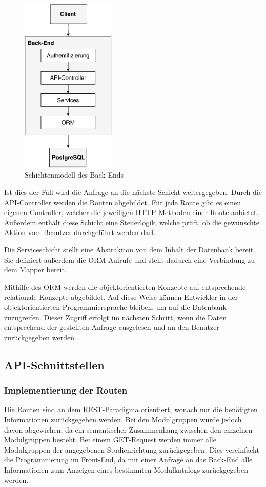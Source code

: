 \begin{figure}[h]
	\centering 
	\includegraphics[width=0.4\textwidth]{img/SchichtenmodellBackend.pdf}
	\captionsetup{format=hang}
	\caption[Schichtenmodell des Back-Ends]{\label{fig:Schichtenmodell}Schichtenmodell des Back-Ends}
\end{figure}

Ist dies der Fall wird die Anfrage an die nächste Schicht weitergegeben.
Durch die API-Controller werden die Routen abgebildet.
Für jede Route gibt es einen eigenen Controller, welcher die jeweiligen \acs{HTTP}-Methoden einer Route anbietet.
Außerdem enthält diese Schicht eine Steuerlogik, welche prüft, ob die gewünschte Aktion vom Benutzer durchgeführt werden darf. 

Die Serviceschicht stellt eine Abstraktion von dem Inhalt der Datenbank bereit.
Sie definiert außerdem die \ac{ORM}-Aufrufe und stellt dadurch eine Verbindung zu dem Mapper bereit. 

Mithilfe des \ac{ORM} werden die objektorientierten Konzepte auf entsprechende relationale Konzepte abgebildet.
Auf diese Weise können Entwickler in der objektorientierten Programmiersprache bleiben, um auf die Datenbank zuzugreifen.
Dieser Zugriff erfolgt im nächsten Schritt, wenn die Daten entsprechend der gestellten Anfrage ausgelesen und an den Benutzer zurückgegeben werden. 

\subsection{API-Schnittstellen}
\subsubsection{Implementierung der Routen}
Die Routen sind an dem \ac{REST}-Paradigma orientiert, wonach nur die benötigten Informationen zurückgegeben werden.
Bei den Modulgruppen wurde jedoch davon abgewichen, da ein semantischer Zusammenhang zwischen den einzelnen Modulgruppen besteht.
Bei einem GET-Request werden immer alle Modulgruppen der angegebenen Studienrichtung zurückgegeben.
Dies vereinfacht die Programmierung im Front-End, da mit einer Anfrage an das Back-End alle Informationen zum Anzeigen eines bestimmten Modulkatalogs zurückgegeben werden.

